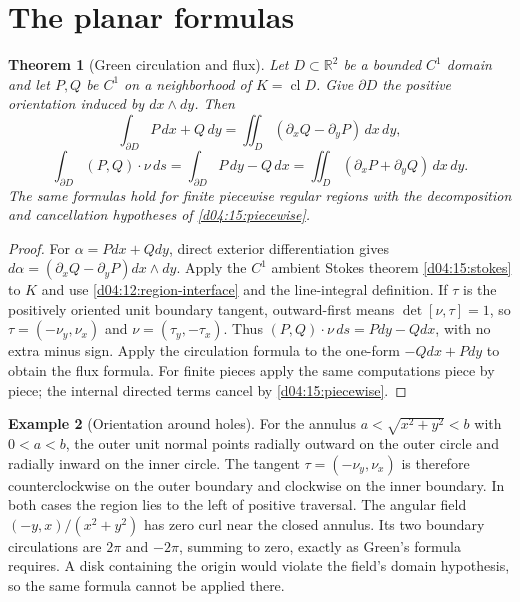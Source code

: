 \documentclass[11pt,oneside,openany]{book}
\newtheorem{theorem}{Theorem}[chapter]
\theoremstyle{definition}
\newtheorem{example}[theorem]{Example}
\theoremstyle{remark}
\newcommand{\R}{\mathbb R}
\DeclareMathOperator{\cl}{cl}
\newcommand{\family}[1]{}
\begin{document}
\section{The planar formulas}
\family{K04.12.01}\family{K04.12.02}\family{K04.12.05}\family{K04.12.06}
\begin{theorem}[Green circulation and flux]\label{d04:12:green}
Let $D\subset\R^2$ be a bounded $C^1$ domain and let $P,Q$ be $C^1$ on
a neighborhood of $K=\cl D$. Give $\partial D$ the positive orientation
induced by $dx\wedge dy$. Then
\[
 \int_{\partial D}P\,dx+Q\,dy
 =\iint_D(\partial_xQ-\partial_yP)\,dx\,dy,
\]
\[
 \int_{\partial D}(P,Q)\cdot\nu\,ds
 =\int_{\partial D}P\,dy-Q\,dx
 =\iint_D(\partial_xP+\partial_yQ)\,dx\,dy.
\]
The same formulas hold for finite piecewise regular regions with the
decomposition and cancellation hypotheses of \cref{d04:15:piecewise}.
\end{theorem}
\begin{proof}
For $\alpha=Pdx+Qdy$, direct exterior differentiation gives
$d\alpha=(\partial_xQ-\partial_yP)dx\wedge dy$.
Apply the $C^1$ ambient Stokes theorem \cref{d04:15:stokes} to $K$ and
use \cref{d04:12:region-interface} and the line-integral definition.
If $\tau$ is the positively oriented unit boundary tangent, outward-first
means $\det[\nu,\tau]=1$, so
$\tau=(-\nu_y,\nu_x)$ and $\nu=(\tau_y,-\tau_x)$.
Thus $(P,Q)\cdot\nu\,ds=Pdy-Qdx$, with no extra minus sign.
Apply the circulation formula to the one-form $-Qdx+Pdy$ to obtain the
flux formula. For finite pieces apply the same computations piece by piece;
the internal directed terms cancel by \cref{d04:15:piecewise}.
\end{proof}

\begin{example}[Orientation around holes]\label{d04:12:annulus}
For the annulus $a<\sqrt{x^2+y^2}<b$ with $0<a<b$, the outer unit normal points radially outward
on the outer circle and radially inward on the inner circle. The tangent
$\tau=(-\nu_y,\nu_x)$ is therefore counterclockwise on the outer boundary
and clockwise on the inner boundary. In both cases the region lies to the
left of positive traversal. The angular field
$(-y,x)/(x^2+y^2)$ has zero curl near the closed annulus. Its two boundary
circulations are $2\pi$ and $-2\pi$, summing to zero, exactly as Green's
formula requires. A disk containing the origin would violate the field's
domain hypothesis, so the same formula cannot be applied there.
\end{example}
\end{document}
